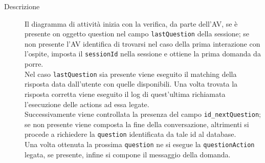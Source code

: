 \documentclass[../DefinizioneDiProdotto_v3.0.0.tex]{subfiles}
\begin{document}
\begin{description}
	\item [Descrizione] Il diagramma di attività inizia con la verifica, da parte dell'AV, se è presente on oggetto question nel campo \texttt{lastQuestion} della sessione; se non presente l'AV identifica di trovarsi nel caso della prima interazione con l'ospite, imposta il \texttt{sessionId} nella sessione e ottiene la prima domanda da porre.\\Nel caso \texttt{lastQuestion} sia presente viene eseguito il matching della risposta data dall'utente con quelle disponibili. Una volta trovata la risposta corretta viene eseguito il log di quest'ultima richiamata l'esecuzione delle actions ad essa legate.\\
	Successivamente viene controllata la presenza del campo \texttt{id\_nextQuestion}; se non presente viene composta la fine della conversazione, altrimenti si procede a richiedere la \texttt{question} identificata da tale id al database.\\
	Una volta ottenuta la prossima \texttt{question} ne si esegue la \texttt{questionAction} legata, se presente, infine si compone il messaggio della domanda.
\end{description}
\end{document}
